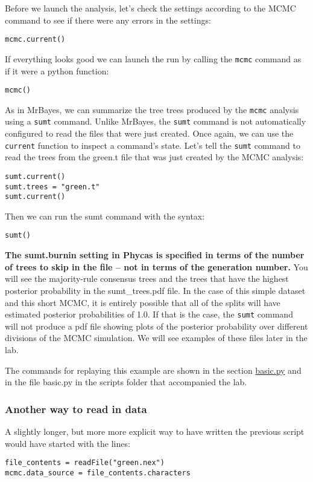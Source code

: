 \documentclass{article}
\newcommand{\cmd}[1]{\texttt{#1}\xspace}
\newcommand{\mb}{MrBayes\xspace}
\newcommand{\phycas}{Phycas\xspace}
\newcommand{\localfile}[1]{\textsf{#1}\xspace}
\begin{document}
Before we launch the analysis, let's check the settings according to the MCMC command
to see if there were any errors in the settings:
\begin{verbatim}
mcmc.current()
\end{verbatim}

If everything looks good we can launch the run by calling the \cmd{mcmc} command
as if it were a python function:
\begin{verbatim}
mcmc()
\end{verbatim}

As in \mb, we can summarize the tree trees produced by the \cmd{mcmc} analysis
using a \cmd{sumt} command.
Unlike \mb, the \cmd{sumt} command is not automatically configured to read the files
that were just created.
Once again, we can use the \cmd{current} function to inspect a command's state.
Let's tell the \cmd{sumt} command to read the trees from the \localfile{green.t} file
that was just created by the MCMC analysis:
\begin{verbatim}
sumt.current()
sumt.trees = "green.t"
sumt.current()
\end{verbatim}

Then we can run the sumt command with the syntax:
\begin{verbatim}
sumt()
\end{verbatim}
\textbf{The sumt.burnin setting in \phycas is specified in terms of the number of trees to skip in the file -- not in terms of the generation number.}
You will see the majority-rule consensus trees and the trees that have the 
highest posterior probability in the \localfile{sumt\_trees.pdf} file.
In the case of this simple dataset and this short MCMC, it is entirely possible that all of the 
splits will have estimated posterior probabilities of 1.0.
If that is the case, the \cmd{sumt} command will not produce a pdf file showing 
plots of the posterior probability over different divisions of the MCMC
simulation.
We will see examples of these files later in the lab.

The commands for replaying this example are shown in the section \hyperref[basicpy]{basic.py} and in the file \localfile{basic.py} in the scripts folder that accompanied the lab.

\subsubsection{Another way to read in data}
A slightly longer, but more more explicit way to have written the previous 
script would have started with the lines:
\begin{verbatim}
file_contents = readFile("green.nex")
mcmc.data_source = file_contents.characters
\end{verbatim}
\end{document}
